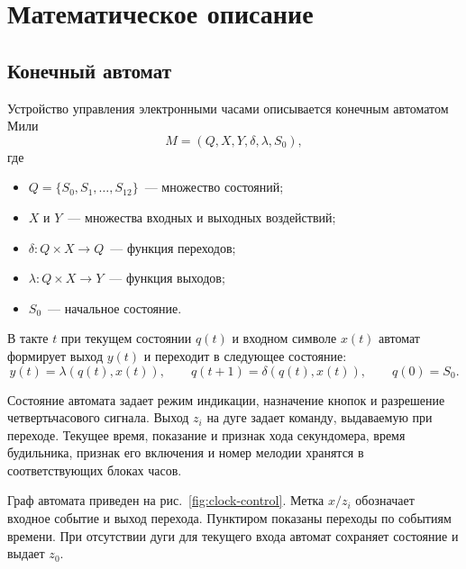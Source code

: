 \newpage
\section{Математическое описание}
\label{sec:math}

\subsection{Конечный автомат}
\label{sec:automaton}

Устройство управления электронными часами описывается конечным автоматом Мили
\[
	M = (Q, X, Y, \delta, \lambda, S_0),
\]
где
\begin{itemize}
	\item $Q = \{S_0,S_1,\ldots,S_{12}\}$~--- множество состояний;
	\item $X$ и $Y$~--- множества входных и выходных воздействий;
	\item $\delta\colon Q \times X \to Q$~--- функция переходов;
	\item $\lambda\colon Q \times X \to Y$~--- функция выходов;
	\item $S_0$~--- начальное состояние.
\end{itemize}

В такте $t$ при текущем состоянии $q(t)$ и входном символе $x(t)$ автомат формирует выход $y(t)$ и переходит в следующее состояние:
\[
	y(t) = \lambda(q(t), x(t)), \qquad
	q(t+1) = \delta(q(t), x(t)), \qquad q(0) = S_0.
\]

Состояние автомата задает режим индикации, назначение кнопок и разрешение четвертьчасового сигнала. Выход $z_i$ на дуге задает команду, выдаваемую при переходе. Текущее время, показание и признак хода секундомера, время будильника, признак его включения и номер мелодии хранятся в соответствующих блоках часов.

Граф автомата приведен на рис.~\ref{fig:clock-control}. Метка $x/z_i$ обозначает входное событие и выход перехода. Пунктиром показаны переходы по событиям времени. При отсутствии дуги для текущего входа автомат сохраняет состояние и выдает $z_0$.









